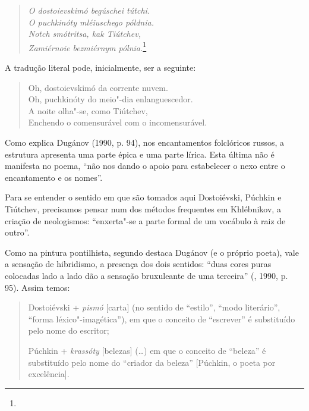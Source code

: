 \begin{verse}
\emph{O dostoievskimó begúschei tútchi.} \\
\emph{O puchkinóty mléiuschego póldnia.} \\ 
\emph{Notch smótritsa, kak Tiútchev,} \\
\emph{Zamiérnoie bezmiérnym pólnia.}\footnote{{}} 

\end{verse}

A tradução literal pode, inicialmente, ser a seguinte:

\pagebreak

\begin{verse}
Oh, dostoievskimó da corrente nuvem. \\
Oh, puchkinóty do meio"-dia \qb{}enlanguescedor. \\
A noite olha"-se, como Tiútchev, \\
Enchendo o comensurável com o \qb{}incomensurável.
\end{verse}

Como explica Dugánov (1990, p. 94), nos encantamentos folclóricos
russos, a estrutura apresenta uma parte épica e uma parte lírica. Esta
última não é manifesta no poema, ``não nos dando o apoio para
estabelecer o nexo entre o encantamento e os nomes''.

Para se entender o sentido em que são tomados aqui Dostoiévski, Púchkin e Tiútchev, precisamos pensar num dos métodos frequentes em Khlébnikov, a criação de neologismos: ``enxerta"-se a parte formal de um vocábulo à raiz de outro''.

Como na pintura pontilhista, segundo destaca Dugánov (e o próprio poeta), vale a sensação de hibridismo, a presença dos dois sentidos: ``duas cores puras colocadas lado a lado dão a
sensação bruxuleante de uma terceira'' (, 1990, p. 95). Assim temos:

\begin{quotation}
Dostoiévski + \emph{pismó} [carta] (no sentido de ``estilo'', ``modo literário'', ``forma
léxico"-imagética''), em que o conceito de ``escrever'' é substituído pelo
nome do escritor;

Púchkin + \emph{krassóty} [belezas] (\ldots{}) em que o conceito de ``beleza'' é substituído
pelo nome do ``criador da beleza'' [Púchkin, o poeta por excelência].
\end{quotation}

